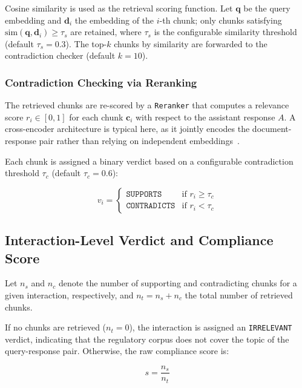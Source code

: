 \documentclass[11pt]{article}
\begin{document}
Cosine similarity is used as the retrieval scoring function. Let $\mathbf{q}$ be the query embedding and $\mathbf{d}_i$ the embedding of the $i$-th chunk; only chunks satisfying $\text{sim}(\mathbf{q}, \mathbf{d}_i) \geq \tau_s$ are retained, where $\tau_s$ is the configurable similarity threshold (default $\tau_s = 0.3$). The top-$k$ chunks by similarity are forwarded to the contradiction checker (default $k = 10$).

\subsubsection{Contradiction Checking via Reranking}

The retrieved chunks are re-scored by a \texttt{Reranker} that computes a relevance score $r_i \in [0, 1]$ for each chunk $\mathbf{c}_i$ with respect to the assistant response $A$. A cross-encoder architecture is typical here, as it jointly encodes the document-response pair rather than relying on independent embeddings~\cite{nogueira2019passage}.

Each chunk is assigned a binary verdict based on a configurable contradiction threshold $\tau_c$ (default $\tau_c = 0.6$):

\begin{equation}
    v_i = \begin{cases}
        \texttt{SUPPORTS}     & \text{if } r_i \geq \tau_c \\
        \texttt{CONTRADICTS}  & \text{if } r_i < \tau_c
    \end{cases}
\end{equation}

\subsection{Interaction-Level Verdict and Compliance Score}

Let $n_s$ and $n_c$ denote the number of supporting and contradicting chunks for a given interaction, respectively, and $n_t = n_s + n_c$ the total number of retrieved chunks.

If no chunks are retrieved ($n_t = 0$), the interaction is assigned an \texttt{IRRELEVANT} verdict, indicating that the regulatory corpus does not cover the topic of the query-response pair. Otherwise, the raw compliance score is:

\begin{equation}
    s = \frac{n_s}{n_t}
\end{equation}
\end{document}
